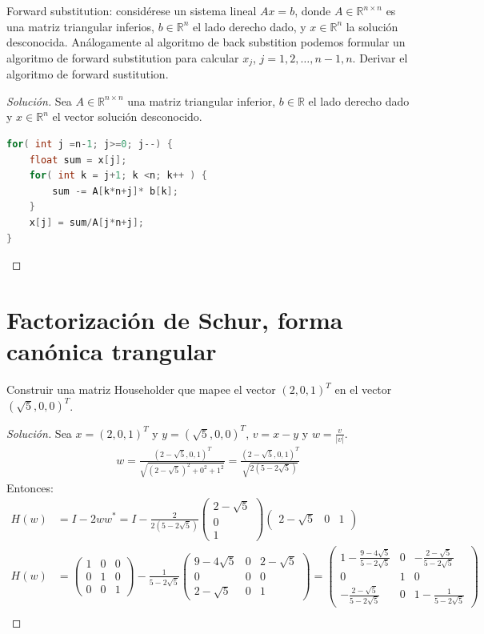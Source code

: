 \documentclass[12pt]{book}
\newcommand{\R}{\mathbb{R}}
\newenvironment{solucion}
  {\renewcommand\qedsymbol{$\square$}\begin{proof}[Solución]}
  {\end{proof}}
\begin{document}
\eje Forward substitution: considérese un sistema lineal $Ax=b$, donde $A\in\R^{n\times n}$ es una matriz triangular inferios, $b\in\R^n$ el lado derecho dado, y $x\in\R^n$ la solución desconocida. Análogamente al algoritmo de back substition podemos formular un algoritmo de forward substitution para calcular $x_j$, $j=1,2,\dots,n-1,n$. Derivar el algoritmo de forward sustitution.
\begin{solucion}
Sea $A \in \R^{n\times n}$ una matriz triangular inferior, $b\in \R$ el lado derecho dado y $x \in \R^n$ el vector solución desconocido.\\
\begin{lstlisting}[language=Java]
for( int j =n-1; j>=0; j--) {
    float sum = x[j];
    for( int k = j+1; k <n; k++ ) {
        sum -= A[k*n+j]* b[k];
    }
    x[j] = sum/A[j*n+j];
}
\end{lstlisting}
\end{solucion}
\section{Factorización de Schur, forma canónica trangular}
\eje Construir una matriz Householder que mapee el vector $(2,0,1)^T$ en el vector $(\sqrt{5},0,0)^T$.
\begin{solucion}
Sea $x=(2,0,1)^T$ y $y=(\sqrt{5},0,0)^T$, $v=x-y$ y $w=\frac{v}{|v|}$.
\begin{align*}
    w=\frac{(2-\sqrt{5},0,1)^T}{\sqrt{(2-\sqrt{5})^2+0^2+1^2}}=\frac{(2-\sqrt{5},0,1)^T}{\sqrt{2(5-2\sqrt{5})}}
\end{align*}
Entonces:
\begin{align*}
    H(w)&=I-2ww^*=I-\frac{2}{2(5-2\sqrt{5})}\begin{pmatrix}
        2-\sqrt{5}\\
        0\\
        1
    \end{pmatrix}\begin{pmatrix}
        2-\sqrt{5} &0&1
    \end{pmatrix}\\
    H(w)&=\begin{pmatrix}
        1&0&0\\
        0&1&0\\
        0&0&1
    \end{pmatrix}-\frac{1}{5-2\sqrt{5}}\begin{pmatrix}
        9-4\sqrt{5}&0&2-\sqrt{5}\\
        0&0&0\\
        2-\sqrt{5}&0&1
    \end{pmatrix}=\begin{pmatrix}
        1-\frac{9-4\sqrt{5}}{5-2\sqrt{5}}&0&-\frac{2-\sqrt{5}}{5-2\sqrt{5}}\\
        0&1&0\\
        -\frac{2-\sqrt{5}}{5-2\sqrt{5}}&0&1-\frac{1}{5-2\sqrt{5}}
    \end{pmatrix}\\
\end{align*}

\end{solucion}
\end{document}
